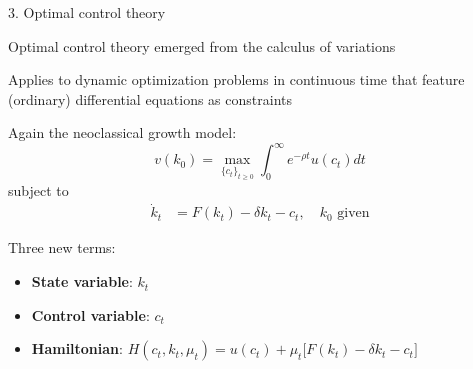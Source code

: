 \documentclass[11pt, aspectratio=169]{beamer}
\newenvironment{witemize}{\itemize\addtolength{\itemsep}{10pt}}{\enditemize}
\begin{document}
\begin{frame}{3. Optimal control theory}
\begin{witemize}
\item Optimal control theory emerged from the calculus of variations

\item Applies to dynamic optimization problems in continuous time that feature (ordinary) differential equations as constraints

\item Again the neoclassical growth model:
\begin{equation*}
	v(k_0) = \max_{\{ c_t \}_{t \geq 0} } \int_0^\infty e^{-\rho t} u(c_t) dt
\end{equation*}
subject to
\begin{align*}
	\dot k_t &= F(k_t) - \delta k_t - c_t,  \quad k_0 \text{ given}
\end{align*}

\item Three new terms: 
\begin{itemize}
	\item \textbf{State variable}: $k_t$
	
	\item \textbf{Control variable}: $c_t$
	
	\item \textbf{Hamiltonian}: $H(c_t, k_t, \mu_t) = u(c_t) + \mu_t \big[ F(k_t) - \delta k_t - c_t \big]$
\end{itemize}
\end{witemize}	
\end{frame}
\end{document}
